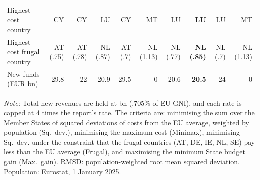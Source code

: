 \begin{table}[htbp]
\begin{tabular}{@{}l*{9}{r}@{}}
Highest-cost country & CY & CY & LU & CY & MT & LU & \textbf{LU} & LU & MT \\
Highest-cost frugal country & AT (.75) & AT (.78) & NL (.87) & AT (.7) & NL (1.13) & NL (.77) & \textbf{NL (.85)} & NL (.7) & NL (1.13) \\
New funds (EUR bn) & 29.8 & 22 & 20.9 & 29.5 & 0 & 20.6 & \textbf{20.5} & 24 & 0 \\
\bottomrule
\end{tabular}
\begin{minipage}{\textwidth}\vspace{4pt}\footnotesize \textit{Note:} Total new revenues are held at  bn (.705\% of EU GNI), and each rate is capped at 4 times the report's rate. The criteria are: minimising the sum over the Member States of squared deviations of costs from the EU average, weighted by population (Sq.\ dev.), minimising the maximum cost (Minimax), minimising Sq.\ dev. under the constraint that the frugal countries (AT, DE, IE, NL, SE) pay less than the EU average (Frugal), and maximising the minimum State budget gain (Max.\ gain). RMSD: population-weighted root mean squared deviation. Population: Eurostat, 1 January 2025.\end{minipage}
\end{table}
